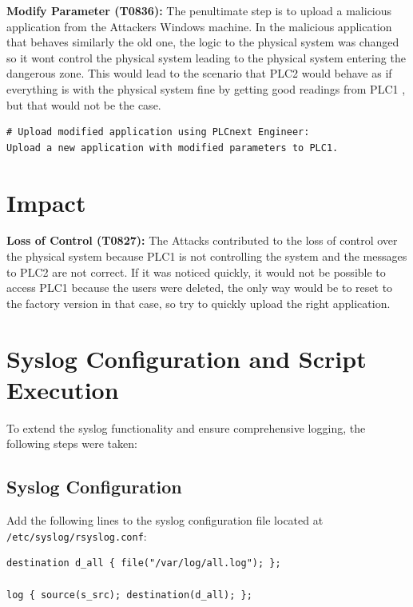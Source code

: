 \documentclass[Master,BMR,english]{twbook}
\begin{document}
\textbf{Modify Parameter (T0836):} The penultimate step is to upload a malicious application from the Attackers Windows machine. In the malicious application that behaves similarly the old one, the logic to the physical system was changed so it wont control the physical system leading to the physical system entering the dangerous zone. This would lead to the scenario that PLC2 would behave as if everything is with the physical system fine by getting good readings from PLC1 , but that would not be the case.

\begin{listing}[htbp]
\begin{verbatim}
# Upload modified application using PLCnext Engineer:
Upload a new application with modified parameters to PLC1.
\end{verbatim}
\caption{Modify Parameter}
\end{listing}

\section*{Impact}

\textbf{Loss of Control (T0827):} The Attacks contributed to the loss of control over the physical system because PLC1 is not controlling the system and the messages to PLC2 are not correct. If it was noticed quickly, it would not be possible to access PLC1 because the users were deleted, the only way would be to reset to the factory version in that case, so try to quickly upload the right application.


\section*{Syslog Configuration and Script Execution}

To extend the syslog functionality and ensure comprehensive logging, the following steps were taken:

\subsection*{Syslog Configuration}

Add the following lines to the syslog configuration file located at \texttt{/etc/syslog/rsyslog.conf}:

\begin{verbatim}
destination d_all { file("/var/log/all.log"); };

log { source(s_src); destination(d_all); };
\end{verbatim}
\end{document}
